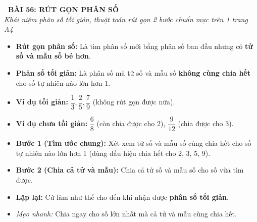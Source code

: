 \documentclass[14pt,a4paper,oneside]{extbook}
\begin{document}
\noindent
\begin{tcolorbox}[
  enhanced,
  colback=teal!8!white,
  colframe=teal!80!black,
  arc=3mm, boxrule=1pt,
  left=3mm, right=3mm, top=2mm, bottom=2mm,
  halign=center
]
  {\Large\bfseries\color{teal!90!black}\faBookmark\ BÀI 56: RÚT GỌN PHÂN SỐ}\\[1.5pt]
  {\footnotesize\itshape\color{black!75} Khái niệm phân số tối giản, thuật toán rút gọn 2 bước chuẩn mực trên 1 trang A4}
\end{tcolorbox}

\vspace{-2.5mm}

\noindent
\begin{minipage}[t]{0.49\textwidth}\vspace{0pt}
\begin{tcolorbox}[
  enhanced,
  colback=blue!4!white,
  colframe=blue!75!black,
  arc=2mm, boxrule=0.8pt,
  left=2mm, right=2mm, top=1.8mm, bottom=1.8mm,
  title={\footnotesize\bfseries\color{white}\faCompress\ 1. Khái niệm phân số tối giản}
]
{\footnotesize
\begin{itemize}\setlength{\itemsep}{1pt}\setlength{\leftskip}{-2.5mm}
  \item \textbf{Rút gọn phân số:} Là tìm phân số mới bằng phân số ban đầu nhưng có \textbf{tử số và mẫu số bé hơn}.
  \item \textbf{Phân số tối giản:} Là phân số mà tử số và mẫu số \textbf{không cùng chia hết} cho số tự nhiên nào lớn hơn 1.
  \item \textbf{Ví dụ tối giản:} $\dfrac{1}{3}, \dfrac{2}{5}, \dfrac{7}{9}$ (không rút gọn được nữa).
  \item \textbf{Ví dụ chưa tối giản:} $\dfrac{6}{8}$ (còn chia được cho 2), $\dfrac{9}{12}$ (chia được cho 3).
\end{itemize}
}
\end{tcolorbox}
\end{minipage}
\hfill
\begin{minipage}[t]{0.49\textwidth}\vspace{0pt}
\begin{tcolorbox}[
  enhanced,
  colback=teal!4!white,
  colframe=teal!75!black,
  arc=2mm, boxrule=0.8pt,
  left=2mm, right=2mm, top=1.8mm, bottom=1.8mm,
  title={\footnotesize\bfseries\color{white}\faCogs\ 2. Quy trình 2 bước rút gọn}
]
{\footnotesize
\begin{itemize}\setlength{\itemsep}{1.5pt}\setlength{\leftskip}{-2.5mm}
  \item \textbf{Bước 1 (Tìm ước chung):} Xét xem tử số và mẫu số cùng chia hết cho số tự nhiên nào lớn hơn 1 (dùng dấu hiệu chia hết cho 2, 3, 5, 9).
  \item \textbf{Bước 2 (Chia cả tử và mẫu):} Chia cả tử số và mẫu số cho số vừa tìm được.
  \item \textbf{Lặp lại:} Cứ làm như thế cho đến khi nhận được \textbf{phân số tối giản}.
  \item \textit{Mẹo nhanh:} Chia ngay cho số lớn nhất mà cả tử và mẫu cùng chia hết.
\end{itemize}
}
\end{tcolorbox}
\end{minipage}
\end{document}
